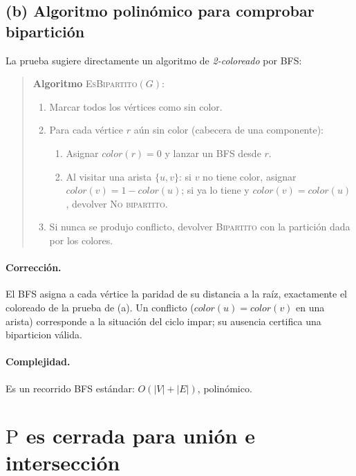 \documentclass[11pt,a4paper]{article}
\theoremstyle{plain}
\theoremstyle{definition}
\newcommand{\Pclass}{\mathrm{P}}
\begin{document}
\subsection*{(b) Algoritmo polin\'omico para comprobar bipartici\'on}

La prueba sugiere directamente un algoritmo de \emph{2-coloreado} por BFS:

\begin{quote}
\textbf{Algoritmo} \textsc{EsBipartito}$(G)$:
\begin{enumerate}[nosep]
  \item Marcar todos los v\'ertices como sin color.
  \item Para cada v\'ertice $r$ a\'un sin color (cabecera de una componente):
        \begin{enumerate}[nosep]
          \item Asignar $color(r)=0$ y lanzar un BFS desde $r$.
          \item Al visitar una arista $\{u,v\}$: si $v$ no tiene color, asignar
                $color(v)=1-color(u)$; si ya lo tiene y $color(v)=color(u)$,
                devolver \textsc{No bipartito}.
        \end{enumerate}
  \item Si nunca se produjo conflicto, devolver \textsc{Bipartito} con la
        partici\'on dada por los colores.
\end{enumerate}
\end{quote}

\paragraph{Correcci\'on.} El BFS asigna a cada v\'ertice la paridad de su distancia
a la ra\'iz, exactamente el coloreado de la prueba de (a). Un conflicto
($color(u)=color(v)$ en una arista) corresponde a la situaci\'on del ciclo impar; su
ausencia certifica una biparticion v\'alida.

\paragraph{Complejidad.} Es un recorrido BFS est\'andar: $O(|V|+|E|)$, polin\'omico.

\section{$\Pclass$ es cerrada para uni\'on e intersecci\'on}
\end{document}
